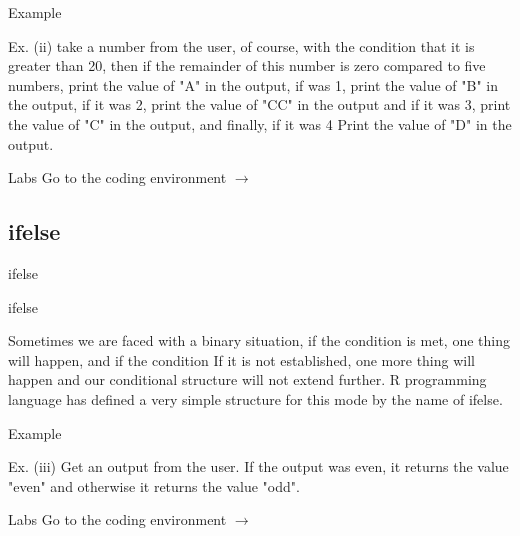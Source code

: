 \documentclass{beamer}\usepackage[]{graphicx}\usepackage[]{xcolor}
\begin{document}
\begin{frame}{Example}
\begin{exampleblock}{Ex. (ii)}
take a number from the user, of course, with the condition that it is greater than 20, then if the remainder of this number is zero compared to five numbers, print the value of "A" in the output, if
    was 1, print the value of "B" in the output, if it was 2, print the value of "CC" in the output and if it was 3, print the value of "C" in the output, and finally, if it was 4
    Print the value of "D" in the output.
\end{exampleblock}
\end{frame}


\begin{frame}{Labs}
    \alert{{\Large Go to the coding environment $\rightarrow$}}
\end{frame}






\subsection{ifelse}

\begin{frame}{ifelse}

    \begin{block}{ifelse}
        
    
Sometimes we are faced with a binary situation, if the condition is met, one thing will happen, and if the condition
    If it is not established, one more thing will happen and our conditional structure will not extend further.
    R programming language has defined a very simple structure for this mode
    by the name of ifelse. 
\end{block}
\end{frame}



\begin{frame}{Example}
\begin{exampleblock}{Ex. (iii)}
Get an output from the user. If the output was even, it returns the value "even" and otherwise it returns the value "odd".
\end{exampleblock}
\end{frame}







\begin{frame}{Labs}
    \alert{{\Large Go to the coding environment $\rightarrow$}}
    \end{frame}
\end{document}

